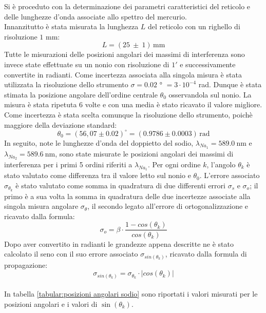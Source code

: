 \documentclass{article}
\begin{document}
        Si è proceduto con la determinazione dei parametri caratteristici del reticolo e delle lunghezze d'onda associate allo spettro del mercurio. \\
        Innanzitutto è stata misurata la lunghezza $L$ del reticolo con un righello di risoluzione $1$ mm: \[L = (25\ \pm \ 1)\, \mathrm{mm}\]
        Tutte le misurazioni delle posizioni angolari dei massimi di interferenza sono invece state effettuate su un nonio con risoluzione di $1'$ e 
        successivamente  convertite in radianti. Come incertezza associata alla singola misura è stata utilizzata la risoluzione dello strumento
        $\sigma = 0.02$ ° $ = 3\cdot10^{-4}$ rad.
        Dunque è stata stimata la posizione angolare dell'ordine centrale $\theta_0$ osservandola sul nonio. La misura è stata ripetuta 6 volte 
        e con una media è stato ricavato il valore migliore. Come incertezza è stata scelta comunque la risoluzione dello strumento, 
        poichè maggiore della deviazione standard: \[\theta_0 = (56,07 \pm 0.02) ^{\circ} = (0.9786	\pm 0.0003 )\, \mathrm{rad}\]
        In seguito, note le lunghezze d'onda del doppietto del sodio, $\lambda_{{Na}_1} = 589.0\ \mathrm{nm}$ e $\lambda_{{Na}_2} = 589.6\ \mathrm{nm}$,
        sono state misurate le posizioni angolari dei massimi di interferenza per i primi 5 ordini riferiti a $\lambda_{{Na}_1}$. 
        Per ogni ordine $k$, l'angolo $\theta_k$ è stato valutato come differenza tra il valore letto sul nonio e $\theta_0$. 
        L'errore associato $\sigma_{\theta_k}$ è stato valutato come somma in quadratura di due differenti errori $\sigma_s$ e $\sigma_o$; 
        il primo è a sua volta la somma in quadratura delle due incertezze associate alla singola misura angolare $\sigma_{\theta}$, 
        il secondo legato all'errore di ortogonalizzazione e ricavato dalla formula: \[\sigma_o = \beta \cdot \frac{1-cos(\theta_k)}{cos(\theta_k)}\]
        Dopo aver convertito in radianti le grandezze appena descritte ne è stato calcolato il seno con il suo errore associato $\sigma_{sin(\theta_k)}$,
        ricavato dalla formula di propagazione: \[\sigma_{sin(\theta_k)} = \sigma_{\theta_k} \cdot |cos(\theta_k)|\] \\
        In tabella \ref{tabular:posizioni angolari sodio} sono riportati i valori misurati per le posizioni angolari e i valori di $\sin(\theta_k)$.
\end{document}
